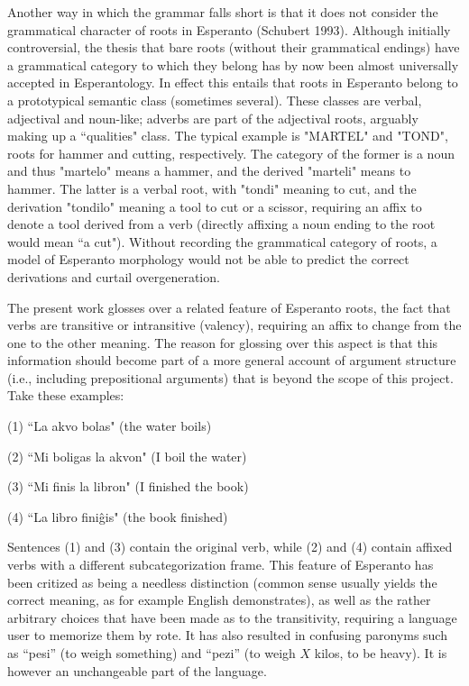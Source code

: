 \documentclass[10pt,a4paper]{article}
\begin{document}
Another way in which the grammar falls short is that it does not consider the
grammatical character of roots in Esperanto (Schubert 1993). Although initially
controversial, the thesis that bare roots (without their grammatical endings)
have a  grammatical category to which they belong has by now been almost
universally accepted in Esperantology. In effect this entails that roots in
Esperanto belong to a prototypical semantic class (sometimes several).  These
classes are verbal, adjectival and noun-like; adverbs are part of the
adjectival roots, arguably making up a ``qualities" class. The
typical example is "MARTEL" and "TOND", roots for hammer and cutting,
respectively. The category of the former is a noun and thus "martelo" means a
hammer, and the derived "marteli" means to hammer. The latter is a verbal root, 
with "tondi" meaning to cut, and the derivation "tondilo" meaning a
tool to cut or a scissor, requiring an affix to denote a tool derived from a
verb (directly affixing a noun ending to the root would mean ``a cut"). Without
recording the grammatical category of roots, a model of Esperanto morphology
would not be able to predict the correct derivations and curtail overgeneration.

The present work glosses over a related feature of Esperanto roots, the fact
that verbs are transitive or intransitive (valency), requiring an affix to
change from the one to the other meaning. The reason for glossing over this
aspect is that this information should become part of a more general account of
argument structure (i.e., including prepositional arguments) that is beyond the
scope of this project. Take these examples:

(1) ``La akvo bolas" (the water boils)

(2) ``Mi boligas la akvon" (I boil the water)

(3) ``Mi finis la libron" (I finished the book)

(4) ``La libro fini\^gis" (the book finished)

Sentences (1) and (3) contain the original verb, while (2) and (4) contain
affixed verbs with a different subcategorization frame. This feature of
Esperanto has been critized as being a needless distinction (common sense
usually yields the correct meaning, as for example English demonstrates),
as well as the rather arbitrary choices that have been made as to the
transitivity, requiring a language user to memorize them by
rote. It has also resulted in confusing paronyms such as ``pesi'' (to weigh
something) and ``pezi'' (to weigh $X$ kilos, to be heavy). It is however an
unchangeable part of the language.
\end{document}
